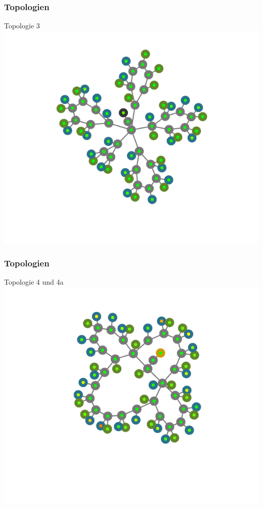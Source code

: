 \documentclass{beamer}
\begin{document}
\begin{frame}
	\frametitle{Topologien}
	\centering
	Topologie 3 \\
	\includegraphics[height=\textheight]{pics/topo_3.png}
\end{frame}

\begin{frame}
	\frametitle{Topologien}
	\centering
	Topologie 4 und 4a
	\includegraphics[height=\textheight]{pics/topo_4_4a.png}
\end{frame}
\end{document}
